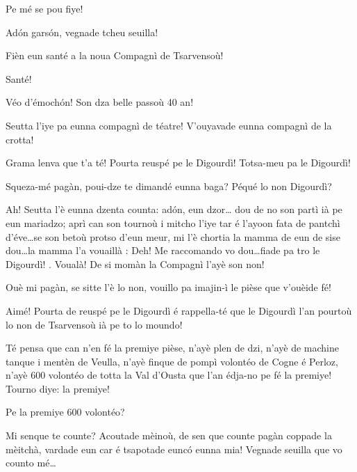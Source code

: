 \begin{drama}
\Marcospeaks Pe mé se pou fiye!

\Pierrespeaks Ad\'on gars\'on, vegnade tcheu seuilla!


\Joelspeaks Fièn eun santé a la noua Compagnì de Tsarvensoù!

\Tcheuttespeaks Santé!




\Paganspeaks Véo d'émoch\'on! Son dza belle passoù 40 an!

\Nevaouspeaks{} Seutta l'iye pa eunna compagnì de téatre! V'ouyavade eunna compagnì de la crotta!

\Paganspeaks Grama lenva que t'a té!  Pourta reuspé pe le Digourdì! Totsa-meu pa le Digourdì!

\Nevaousaspeaks Squeza-mé pagàn, poui-dze te dimandé eunna baga? Péqué lo non Digourdì? 

\Paganspeaks{} Ah!  Seutta l'è eunna dzenta coun\-ta: ad\'on, eun dzor\ldots {} dou de no son partì ià pe eun mariadzo; aprì can son tournoù i mitcho l'iye tar é l'ayoon fata de pantchì d'éve\ldots se son betoù protso d'eun meur, mi l'è chortia la mamma de eun de sise dou\ldots la mamma l'a vouaillà : \og Deh! Me raccomando vo dou\ldots fiade pa tro le Digourdì! \fg{} . Voualà! De si momàn la Compagnì l'ayè son non!

\Nevaouspeaks Ouè mi pagàn, se sitte l'è lo non, vouillo pa imajin-ì le pièse que v'ouèide fé!

\Paganspeaks Aimé! Pourta de reuspé pe le Digourdì é rappella-té que le Digourdì l'an pourtoù lo non de Tsarvensoù ià pe to lo moundo!


\Paganspeaks Té pensa que can n'en fé la premiye pièse,  n’ayè plen de dzi, n’ayè de machine tanque i mentèn de Veulla, n'ayè finque de pompì volontéo de Cogne é Perloz, n’ayè 600 volontéo de totta la Val d'Ousta que l'an édja-no pe fé la premiye! Tourno diye: la premiye!

\Ledouspeaks {} Pe la premiye 600 volontéo? 

\Maganspeaks{} Mi senque te counte?  Acoutade mèinoù, de sen que counte pagàn coppade la mèitchà, vardade eun car é tsapotade euncó eunna mia! Vegnade seuilla  que vo counto mé\ldots


\end{drama}
